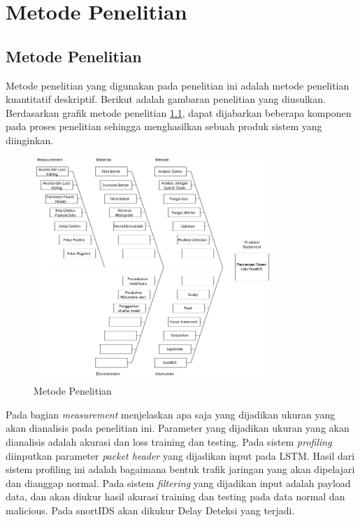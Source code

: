 \documentclass[./skripsi.tex]{subfiles}
\begin{document}
\chapter{Metode Penelitian}
\section{Metode Penelitian}
\par Metode penelitian yang digunakan pada penelitian ini adalah metode penelitian kuantitatif deskriptif. Berikut adalah gambaran penelitian yang diusulkan. Berdasarkan grafik metode penelitian \ref{fig:fishbonepenelitian}, dapat dijabarkan beberapa komponen pada proses penelitian sehingga menghasilkan sebuah produk sistem yang diinginkan.
\begin{figure}%
    \centering
    \includegraphics[width=0.8\textwidth]{public/assets/img/fishbonepenelitian.png}
    \caption{Metode Penelitian}
    \label{fig:fishbonepenelitian}
\end{figure}
\par Pada bagian \textit{measurement} menjelaskan apa saja yang dijadikan ukuran yang akan dianalisis pada penelitian ini. Parameter yang dijadikan ukuran yang akan dianalisis adalah akurasi dan loss training dan testing. Pada sistem \textit{profiling} diinputkan parameter \textit{packet header} yang dijadikan input pada LSTM. Hasil dari sistem profiling ini adalah bagaimana bentuk trafik jaringan yang akan dipelajari dan dianggap normal. Pada sistem \textit{filtering} yang dijadikan input adalah payload data, dan akan diukur hasil akurasi training dan testing pada data normal dan malicious. Pada snortIDS akan dikukur Delay Deteksi yang terjadi.
\end{document}
